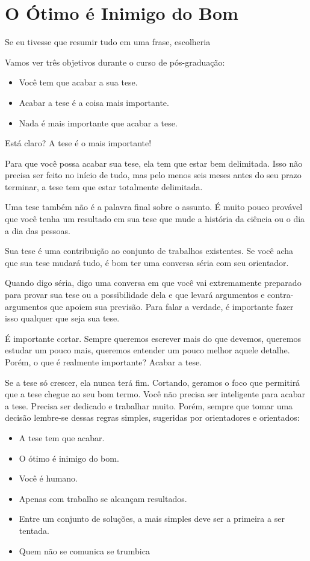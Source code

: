 \chapter{O Ótimo é Inimigo do Bom}

Se eu tivesse que resumir tudo em uma frase, escolheria 



Vamos ver três objetivos durante o curso de pós-graduação:
\begin{itemize}
\item	Você tem que acabar a sua tese. 
\item	Acabar a tese é a coisa mais importante. 
\item	Nada é mais importante que acabar a tese.
\end{itemize}

Está claro? 
A tese é o mais importante!

Para que você possa acabar sua tese, ela tem que estar bem delimitada. Isso não precisa ser feito no início de tudo, mas pelo menos seis meses antes do seu prazo terminar, a tese tem que estar totalmente delimitada. 

Uma tese também não é a palavra final sobre o assunto. É muito pouco provável que você tenha um resultado em sua tese que mude a história da ciência ou o dia a dia das pessoas. 

Sua tese é uma contribuição ao conjunto de trabalhos existentes. Se você acha que sua tese mudará tudo, é bom ter uma conversa séria com seu orientador. 

Quando digo séria, digo uma conversa em que você vai extremamente preparado para provar sua tese ou a possibilidade dela e que levará argumentos e contra-argumentos que apoiem sua previsão. Para falar a verdade, é importante fazer isso qualquer que seja sua tese.

É importante cortar. Sempre queremos escrever mais do que devemos, queremos estudar um pouco mais, queremos entender um pouco melhor aquele detalhe. Porém, o que é realmente importante? Acabar a tese. 

Se a tese só crescer, ela nunca terá fim. Cortando, geramos o foco que permitirá que a tese chegue ao seu bom termo.
Você não precisa ser inteligente para acabar a tese. Precisa ser dedicado e trabalhar muito. Porém, sempre que tomar uma decisão lembre-se dessas regras simples, sugeridas por orientadores e orientados:
\begin{itemize}
    \item A tese tem que acabar. 
    \item O ótimo é inimigo do bom.
    \item Você é humano.
   \item 	Apenas com trabalho se alcançam resultados.
\item	Entre um conjunto de soluções, a mais simples deve ser a primeira a ser tentada.
\item	Quem não se comunica se trumbica
\end{itemize}
	

